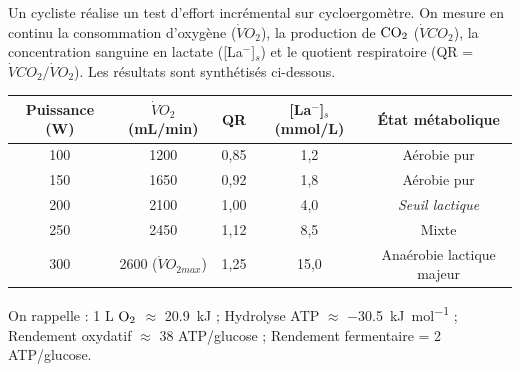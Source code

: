 \documentclass[11pt]{article}
\begin{document}
\begin{exercice}
Un cycliste réalise un test d'effort incrémental sur cycloergomètre. On mesure en continu la consommation d'oxygène ($\dot{V}O_2$), la production de $\ce{CO2}$ ($\dot{V}CO_2$), la concentration sanguine en lactate ([La$^-$]$_s$) et le quotient respiratoire (QR = $\dot{V}CO_2 / \dot{V}O_2$). Les résultats sont synthétisés ci-dessous.

\begin{center}
\begin{tabular}{|c|c|c|c|c|}
\hline
\textbf{Puissance (W)} & \textbf{$\dot{V}O_2$ (mL/min)} & \textbf{QR} & \textbf{[La$^-$]$_s$ (mmol/L)} & \textbf{État métabolique} \\
\hline
100 & 1200 & 0,85 & 1,2 & Aérobie pur \\
150 & 1650 & 0,92 & 1,8 & Aérobie pur \\
200 & 2100 & 1,00 & 4,0 & \textit{Seuil lactique} \\
250 & 2450 & 1,12 & 8,5 & Mixte \\
300 & 2600 ($\dot{V}O_{2max}$) & 1,25 & 15,0 & Anaérobie lactique majeur \\
\hline
\end{tabular}
\end{center}
On rappelle : 1 L $\ce{O2}$ $\approx$ \SI{20,9}{\kilo\joule} ; Hydrolyse ATP $\approx$ \SI{-30,5}{\kilo\joule.mol^{-1}} ; Rendement oxydatif $\approx$ 38 ATP/glucose ; Rendement fermentaire = 2 ATP/glucose.


\end{exercice}
\end{document}
